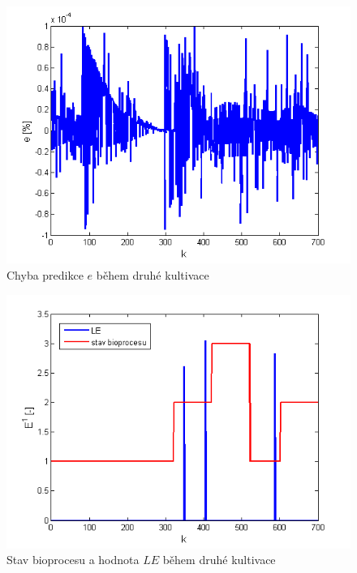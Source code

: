 \documentclass[11pt,twoside,openright]{report}
\begin{document}
\begin{appendices}
\begin{figure}
    \centering
    \includegraphics[scale=0.8]{IMG/artep/artep17_5.png}
    \caption{Chyba predikce $e$ během druhé kultivace}
    \label{fig:artep_4}
\end{figure}

\begin{figure}
    \centering
    \includegraphics[scale=0.8]{IMG/artep/artep17_6.png}
    \caption{Stav bioprocesu a hodnota $LE$ během druhé kultivace}
    \label{fig:artep_6}
\end{figure}
\newpage
\thispagestyle{empty}
\mbox{}
\newpage

\end{appendices}
\end{document}
